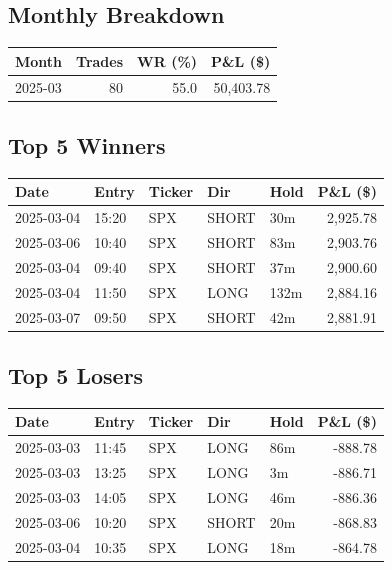 \documentclass[11pt,a4paper,twoside]{article}
\begin{document}
\subsection*{Monthly Breakdown}
\noindent\begin{center}
\begin{tabular}{>{\color{txtmain}}l rrr}
\toprule
\rowcolor{cardbg}
\textbf{Month} & \textbf{Trades} & \textbf{WR (\%)} & \textbf{P\&L (\$)} \\
\midrule
2025-03 & 80 & 55.0 & \textcolor{wingreen}{50,403.78} \\
\bottomrule
\end{tabular}
\end{center}
\subsection*{Top 5 Winners}
\noindent\begin{center}
\begin{tabular}{>{\color{txtmain}}l llll r}
\toprule
\rowcolor{cardbg}
\textbf{Date} & \textbf{Entry} & \textbf{Ticker} & \textbf{Dir} & \textbf{Hold} & \textbf{P\&L (\$)} \\
\midrule
2025-03-04 & 15:20 & SPX & SHORT & 30m & \textcolor{wingreen}{2,925.78} \\
2025-03-06 & 10:40 & SPX & SHORT & 83m & \textcolor{wingreen}{2,903.76} \\
2025-03-04 & 09:40 & SPX & SHORT & 37m & \textcolor{wingreen}{2,900.60} \\
2025-03-04 & 11:50 & SPX & LONG & 132m & \textcolor{wingreen}{2,884.16} \\
2025-03-07 & 09:50 & SPX & SHORT & 42m & \textcolor{wingreen}{2,881.91} \\
\bottomrule
\end{tabular}
\end{center}
\subsection*{Top 5 Losers}
\noindent\begin{center}
\begin{tabular}{>{\color{txtmain}}l llll r}
\toprule
\rowcolor{cardbg}
\textbf{Date} & \textbf{Entry} & \textbf{Ticker} & \textbf{Dir} & \textbf{Hold} & \textbf{P\&L (\$)} \\
\midrule
2025-03-03 & 11:45 & SPX & LONG & 86m & \textcolor{lossred}{-888.78} \\
2025-03-03 & 13:25 & SPX & LONG & 3m & \textcolor{lossred}{-886.71} \\
2025-03-03 & 14:05 & SPX & LONG & 46m & \textcolor{lossred}{-886.36} \\
2025-03-06 & 10:20 & SPX & SHORT & 20m & \textcolor{lossred}{-868.83} \\
2025-03-04 & 10:35 & SPX & LONG & 18m & \textcolor{lossred}{-864.78} \\
\bottomrule
\end{tabular}
\end{center}
\clearpage
\end{document}
